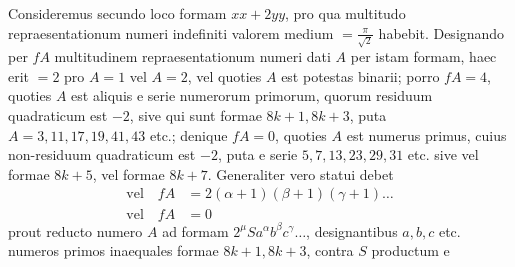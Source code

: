 Consideremus secundo loco formam $xx+2yy$, pro qua multitudo repraesentationum numeri indefiniti valorem medium $=\frac\pi{\surd2}$ habebit. Designando per $fA$ multitudinem repraesentationum numeri dati $A$ per istam formam, haec erit $=2$ pro $A=1$ vel $A=2$, vel quoties $A$ est potestas binarii; porro $fA=4$, quoties $A$ est aliquis e serie numerorum primorum, quorum residuum quadraticum est $-2$, sive qui sunt formae $8k+1,8k+3$, puta $A=3,11,17,19,41,43$ etc.; denique $fA=0$, quoties $A$ est numerus primus, cuius non-residuum quadraticum est $-2$, puta e serie $5,7,13,23,29,31$ etc. sive vel formae $8k+5$, vel formae $8k+7$. Generaliter vero statui debet
\[
\begin{aligned}
\text{vel}\quad fA&=2(\alpha+1)(\beta+1)(\gamma+1)\ldots\\
\text{vel}\quad fA&=0
\end{aligned}
\]
prout reducto numero $A$ ad formam $2^\mu Sa^\alpha b^\beta c^\gamma\ldots$, designantibus $a,b,c$ etc. numeros primos inaequales formae $8k+1,8k+3$, contra $S$ productum e 

